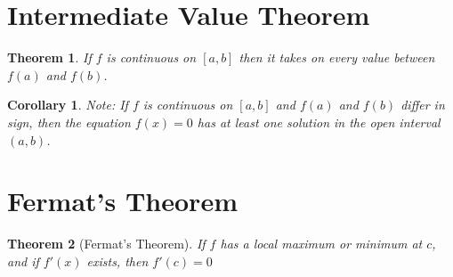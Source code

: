 \documentclass[10pt]{report}
\newtheorem{thm2}{Theorem}[section]
\newtheorem{cor2}{Corollary}[section]
\begin{document}
\section{Intermediate Value Theorem}
\begin{thm2} If $f$ is continuous on $[a,b]$ then it takes on every value between $f(a)$ and $f(b)$.
\end{thm2}
\begin{cor2} Note: If $f$ is continuous on $[a,b]$ and $f(a)$ and $f(b)$ differ in sign, then the equation $f(x) = 0$ has at least one solution in the open interval $(a,b)$.
\end{cor2}
\section{Fermat's Theorem}
\begin{thm2}[Fermat's Theorem]
If $f$ has a local maximum or minimum at $c$, and if $f'(x)$ exists, then $f'(c)=0$
\end{thm2}
\end{document}
